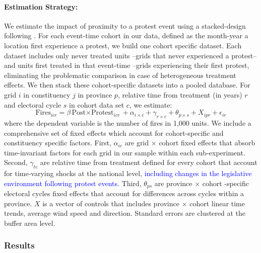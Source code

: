 \documentclass[12pt]{article}
\begin{document}
\paragraph{Estimation Strategy:}
We estimate the impact of proximity to a protest event using a stacked-design following \citet{cengiz2019effect}. For each event-time cohort in our data, defined as the month-year a location first experience a protest, we build one cohort specific dataset. Each dataset includes only never treated units --grids that never experienced a protest-- and units first treated in that event-time --grids experiencing their first protest, eliminating the problematic comparison in case of heterogeneous treatment effects. We then stack these cohort-specific datasets into a pooled database. For grid $i$ in constituency $j$ in province $p$, relative time from treatment (in years) $r$ and electoral cycle $s$ in cohort data set $c$, we estimate: %
\begin{equation}\label{eq_protest}
 { \text{Fires} }_{i c r}=\beta {\text{Post$\times$Protest}}_{i c r}+ \alpha_{i \times c}+ \gamma_{r \times c} + \theta_{p \times s}+ X_{ipr} + \epsilon_{i r}
\end{equation}
where the dependent variable is the number of fires in 1,000 units. We include a comprehensive set of fixed effects which account for cohort-specific and constituency specific factors. First, $\alpha_{ic}$ are grid $\times$ cohort fixed effects that absorb time-invariant factors for each grid in our sample within each sub-experiment. Second, $\gamma_{tc}$ are relative time from treatment defined for every cohort that account for time-varying shocks at the national level\textcolor{blue}{, including changes in the legislative environment following protest events}. Third, $\theta_{ps}$ are province $\times$ cohort -specific electoral cycles fixed effects that account for differences across cycles within a province. $X$ is a vector of controls that includes province $\times$ cohort  linear time trends, average wind speed and direction. Standard errors are clustered at the buffer area level.

\subsubsection{Results\label{sssec:results2}}

\end{document}
